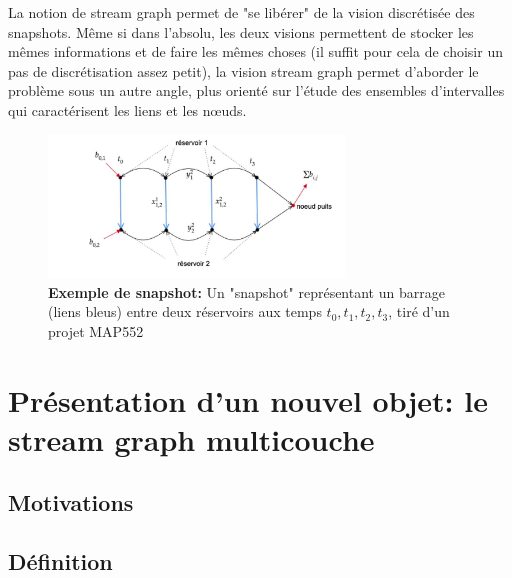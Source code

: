 \documentclass[11pt,a4paper]{article}
\theoremstyle{definition}
\theoremstyle{remark}
\theoremstyle{remark}
\begin{document}
La notion de stream graph permet de "se libérer" de la vision discrétisée des snapshots. Même si dans l'absolu, les deux visions permettent de stocker les mêmes informations et de faire les mêmes choses (il suffit pour cela de choisir un pas de discrétisation assez petit), la vision stream graph permet d'aborder le problème sous un autre angle, plus orienté sur l'étude des ensembles d'intervalles qui caractérisent les liens et les nœuds.

\begin{figure}
\centering
	\includegraphics[width=0.7\textwidth]{snapshot.JPG}
	\caption{\textbf{Exemple de snapshot:} Un "snapshot" représentant un barrage (liens bleus) entre deux réservoirs aux temps $t_0,t_1,t_2,t_3$, tiré d'un projet MAP552}
\end{figure}



\section{Présentation d'un nouvel objet: le stream graph multicouche}



\subsection{Motivations}
\subsection{Définition}
\end{document}
